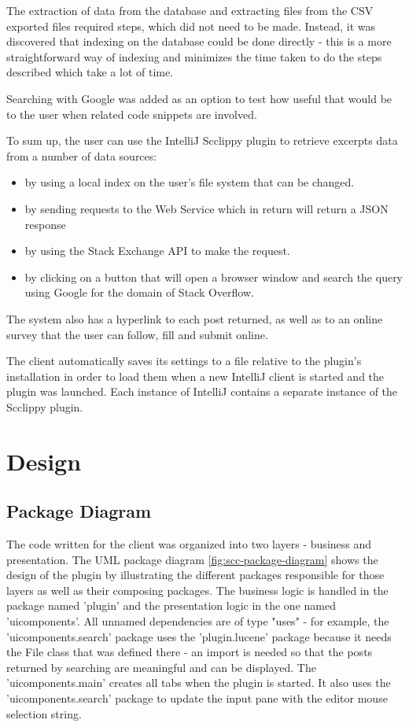 \documentclass{l4proj}
\begin{document}
\noindent
The extraction of data from the database and extracting files from the CSV exported files required steps, which did not need to be made. Instead, it was discovered that indexing on the database could be done directly - this is a more straightforward way of indexing and minimizes the time taken to do the steps described which take a lot of time.

\noindent
Searching with Google was added as an option to test how useful that would be to the user when related code snippets are involved.

\noindent
To sum up, the user can use the IntelliJ Scclippy plugin to retrieve excerpts data from a number of data sources:

\begin{itemize}
\item by using a local index on the user's file system that can be changed.
\item by sending requests to the Web Service which in return will return a JSON response
\item by using the Stack Exchange API to make the request.
\item by clicking on a button that will open a browser window and search the query using Google for the domain of Stack Overflow. 
\end{itemize}

\noindent
The system also has a hyperlink to each post returned, as well as to an online survey that the user can follow, fill and submit online. 

\noindent
The client automatically saves its settings to a file relative to the plugin's installation in order to load them when a new IntelliJ client is started and the plugin was launched. Each instance of IntelliJ contains a separate instance of the Scclippy plugin.

\section{Design}

\subsection{Package Diagram}
The code written for the client was organized into two layers - business and presentation. The UML package diagram \ref{fig:scc-package-diagram} shows the design of the plugin by illustrating the different packages responsible for those layers as well as their composing packages. The business logic is handled in the package named 'plugin' and the presentation logic in the one named 'uicomponents'. All unnamed dependencies are of type "uses" - for example, the 'uicomponents.search' package uses the 'plugin.lucene' package because it needs the File class that was defined there - an import is needed so that the posts returned by searching are meaningful and can be displayed. The 'uicomponents.main' creates all tabs when the plugin is started. It also uses the 'uicomponents.search' package to update the input pane with the editor mouse selection string.
\end{document}
